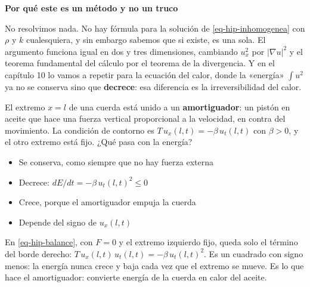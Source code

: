 \documentclass[
  spanish,
  a4paper,
]{scrbook}
\providecommand{\tightlist}{%
  \setlength{\itemsep}{0pt}\setlength{\parskip}{0pt}}
\theoremstyle{definition}
\theoremstyle{plain}
\theoremstyle{definition}
\theoremstyle{plain}
\theoremstyle{definition}
\theoremstyle{remark}
\begin{document}
\begin{tcolorbox}[enhanced jigsaw, arc=.35mm, bottomrule=.15mm, breakable, colback=white, colframe=quarto-callout-tip-color-frame, left=2mm, leftrule=.75mm, opacityback=0, rightrule=.15mm, toprule=.15mm]
\begin{minipage}[t]{5.5mm}
\textcolor{quarto-callout-tip-color}{\faLightbulb}
\end{minipage}%
\begin{minipage}[t]{\textwidth - 5.5mm}

\vspace{-3mm}\textbf{Por qué este es un método y no un truco}\vspace{3mm}

No resolvimos nada. No hay fórmula para la solución de
\ref{eq-hip-inhomogenea} con \(\rho\) y \(k\) cualesquiera, y sin
embargo sabemos que si existe, es una sola. El argumento funciona igual
en dos y tres dimensiones, cambiando \(u_x^2\) por \(|\nabla u|^2\) y el
teorema fundamental del cálculo por el teorema de la divergencia. Y en
el capítulo 10 lo vamos a repetir para la ecuación del calor, donde la
«energía» \(\int u^2\) ya no se conserva sino que \textbf{decrece}: esa
diferencia es la irreversibilidad del calor.

\end{minipage}%
\end{tcolorbox}

El extremo \(x=l\) de una cuerda está unido a un \textbf{amortiguador}:
un pistón en aceite que hace una fuerza vertical proporcional a la
velocidad, en contra del movimiento. La condición de contorno es
\(T\,u_x(l,t) = -\beta\,u_t(l,t)\) con \(\beta>0\), y el otro extremo
está fijo. ¿Qué pasa con la energía?

\begin{itemize}
\tightlist
\item
  {Se conserva, como siempre que no hay fuerza externa}
\item
  {Decrece: \(dE/dt = -\beta\,u_t(l,t)^2 \le 0\)}
\item
  {Crece, porque el amortiguador empuja la cuerda}
\item
  {Depende del signo de \(u_x(l,t)\)}
\end{itemize}

En \ref{eq-hip-balance}, con \(F = 0\) y el extremo izquierdo fijo,
queda solo el término del borde derecho:
\(T\,u_x(l,t)\,u_t(l,t) = -\beta\,u_t(l,t)^2\). Es un cuadrado con signo
menos: la energía nunca crece y baja cada vez que el extremo se mueve.
Es lo que hace el amortiguador: convierte energía de la cuerda en calor
del aceite.
\end{document}
